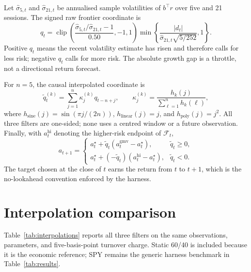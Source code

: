 Let \(\widehat\sigma_{5,t}\) and \(\widehat\sigma_{21,t}\) be annualised sample volatilities of
\(b^{\top}r\) over five and 21 sessions.  The signed raw frontier coordinate is
\begin{equation}\label{eq:tm-coordinate}
 q_t=\operatorname{clip}\!\left(
 \frac{\widehat\sigma_{5,t}/\widehat\sigma_{21,t}-1}{0.50},-1,1\right)
 \min\!\left\{\frac{|d_t|}{\widehat\sigma_{21,t}\sqrt{5/252}},1\right\}.
\end{equation}
Positive \(q_t\) means the recent volatility estimate has risen and therefore calls for less
risk; negative \(q_t\) calls for more risk.  The absolute growth gap is a throttle, not a directional
return forecast.

For \(n=5\), the causal interpolated coordinate is
\begin{equation}\label{eq:tm-interpolation}
 \widetilde q_t^{(k)}=\sum_{j=1}^{n}\kappa_j^{(k)}q_{t-n+j},
 \qquad
 \kappa_j^{(k)}=\frac{h_k(j)}{\sum_{\ell=1}^{n}h_k(\ell)},
\end{equation}
where \(h_{\mathrm{sine}}(j)=\sin(\pi j/(2n))\),
\(h_{\mathrm{linear}}(j)=j\), and \(h_{\mathrm{poly}}(j)=j^2\).  All three filters are one-sided;
none uses a centred window or a future observation.  Finally, with \(a_t^{\mathrm{hi}}\) denoting
the higher-risk endpoint of \(\mathcal F_t\),
\begin{equation}\label{eq:tm-target}
 a_{t+1}=\begin{cases}
 a_t^{\star}+\widetilde q_t(a_t^{\mathrm{gmv}}-a_t^{\star}),
   &\widetilde q_t\geq 0,\\
 a_t^{\star}+(-\widetilde q_t)(a_t^{\mathrm{hi}}-a_t^{\star}),
   &\widetilde q_t<0.
 \end{cases}
\end{equation}
The target chosen at the close of \(t\) earns the return from \(t\) to \(t+1\), which is the
no-lookahead convention enforced by the harness.

\section{Interpolation comparison}\label{sec:interpolation-comparison}

Table~\ref{tab:interpolations} reports all three filters on the same observations, parameters, and
five-basis-point turnover charge.  Static 60/40 is included because it is the economic reference;
SPY remains the generic harness benchmark in Table~\ref{tab:results}.

